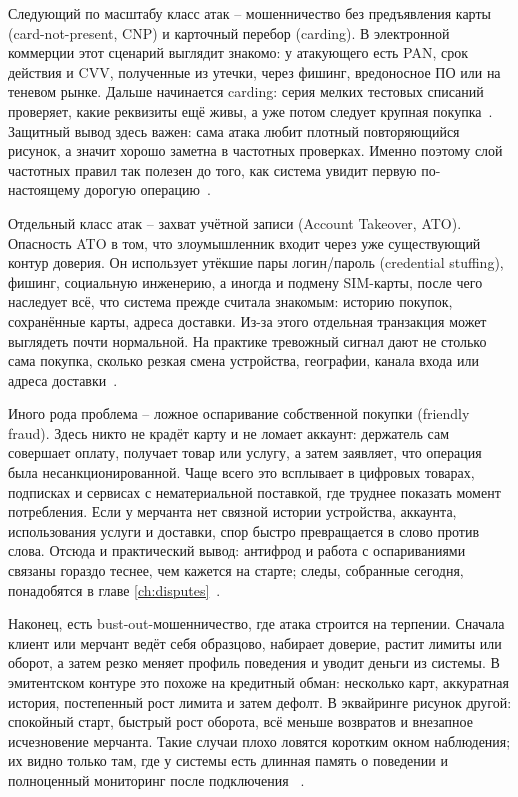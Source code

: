 Следующий по масштабу класс атак -- мошенничество без предъявления
карты (card-not-present, CNP) и карточный перебор (carding). В
электронной коммерции этот сценарий выглядит знакомо: у атакующего
есть PAN, срок действия и CVV, полученные из утечки, через фишинг,
вредоносное ПО или на теневом рынке. Дальше начинается carding:
серия мелких тестовых списаний проверяет, какие реквизиты ещё живы,
а уже потом следует крупная покупка~\cite{mc-fraudulent-merchants-2025}.
Защитный вывод здесь важен:
сама атака любит плотный повторяющийся рисунок, а значит хорошо
заметна в частотных проверках. Именно поэтому слой частотных правил так
полезен до того, как система увидит первую по-настоящему дорогую
операцию~\cite{visa-auth-management-2020}.

Отдельный класс атак -- захват учётной записи (Account Takeover, ATO).
Опасность ATO в том, что злоумышленник входит через уже существующий
контур доверия. Он использует утёкшие пары логин/пароль (credential
stuffing), фишинг, социальную инженерию, а иногда и подмену
SIM-карты, после чего наследует всё, что система прежде считала
знакомым: историю покупок, сохранённые карты, адреса доставки.
Из-за этого отдельная транзакция может выглядеть почти нормальной.
На практике тревожный сигнал дают не столько сама покупка, сколько
резкая смена устройства, географии, канала входа или адреса
доставки~\cite{mc-fraudulent-merchants-2025}.

Иного рода проблема -- ложное оспаривание собственной покупки
(friendly fraud). Здесь никто не крадёт карту и не ломает аккаунт:
держатель сам совершает оплату, получает товар или услугу, а затем
заявляет, что операция была несанкционированной. Чаще всего это
всплывает в цифровых товарах, подписках и сервисах с нематериальной
поставкой, где труднее показать момент потребления. Если у мерчанта
нет связной истории устройства, аккаунта, использования услуги и
доставки, спор быстро превращается в слово против слова. Отсюда и
практический вывод: антифрод и работа с оспариваниями связаны гораздо
теснее, чем кажется на старте; следы, собранные сегодня, понадобятся
в главе \ref{ch:disputes}~\cite{mc-first-party-trust}.

Наконец, есть bust-out-мошенничество, где атака строится на терпении.
Сначала клиент или мерчант ведёт себя образцово, набирает доверие,
растит лимиты или оборот, а затем резко меняет профиль поведения и
уводит деньги из системы. В эмитентском контуре это похоже на
кредитный обман: несколько карт, аккуратная история, постепенный рост
лимита и затем дефолт. В эквайринге рисунок другой: спокойный старт,
быстрый рост оборота, всё меньше возвратов и внезапное исчезновение
мерчанта. Такие случаи плохо ловятся коротким окном наблюдения; их
видно только там, где у системы есть длинная память о поведении и
полноценный мониторинг после подключения~
\cite{visa-merchant-screening-service}\cite{mc-fraudulent-merchants-2025}.

